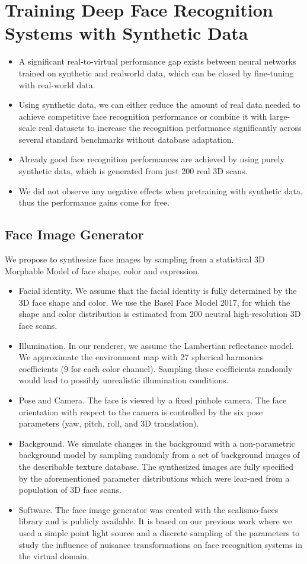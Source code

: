 \documentclass[12pt]{article}
\begin{document}
\section{Training Deep Face Recognition Systems with Synthetic Data}
\begin{itemize}
  \item A significant real-to-virtual performance gap exists between neural networks trained on synthetic and realworld data, which can be closed by fine-tuning with
  real-world data.
  \item Using synthetic data, we can either reduce the amount
  of real data needed to achieve competitive face recognition performance or combine it with large-scale real
  datasets to increase the recognition performance significantly across several standard benchmarks without
  database adaptation.
  \item Already good face recognition performances are
  achieved by using purely synthetic data, which is generated from just 200 real 3D scans.
  \item We did not observe any negative effects when pretraining with synthetic data, thus the performance gains
  come for free.
\end{itemize}
\subsection{Face Image Generator}
We propose to synthesize face images by sampling from a
statistical 3D Morphable Model of face shape, color and expression.
\begin{itemize}
  \item Facial identity. We assume that the facial identity is fully
  determined by the 3D face shape and color. We use the
  Basel Face Model 2017, for which the shape and color
  distribution is estimated from 200 neutral high-resolution 3D
  face scans. 
  \item Illumination. In our renderer, we assume the Lambertian
  reflectance model. We approximate the environment map with
  27 spherical harmonics coefficients (9 for each color channel).
  Sampling these coefficients randomly would lead to possibly
  unrealistic illumination conditions.
  \item Pose and Camera. The face is viewed by a fixed pinhole
  camera. The face orientation with respect to the camera is
  controlled by the six pose parameters (yaw, pitch, roll, and 3D
  translation). 
  \item Background. We simulate changes in the background with a
  non-parametric background model by sampling randomly from
  a set of background images of the describable texture database. The synthesized images are fully specified by the aforementioned parameter distributions which were lear-ned from
  a population of 3D face scans.
  \item Software. The face image generator was created with the
  scalismo-faces library
  and is publicly available. It is based
  on our previous work where we used a simple point light
  source and a discrete sampling of the parameters to study
  the influence of nuisance transformations on face recognition
  systems in the virtual domain.
\end{itemize}
\end{document}
